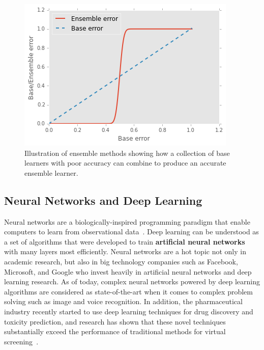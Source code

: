 \documentclass[a4paper,11pt]{article}
\begin{document}
\begin{figure}[!ht]
  \centering
    \includegraphics[scale=1.0]{ensemble}
\caption{\label{fig:ensemble} Illustration of ensemble methods showing how a collection of base learners with poor accuracy can combine to produce an accurate ensemble learner.}
\end{figure}






\subsection{Neural Networks and Deep Learning}

Neural networks are a biologically-inspired programming paradigm that enable computers to learn from observational data~\cite{deeplearning}.
Deep learning can be understood as a set of algorithms that were developed to train \textbf{artificial neural networks} with many layers most efficiently.
 Neural networks are a hot topic not only in academic research, but also in big technology companies such as Facebook, Microsoft, and Google who invest heavily in artificial neural networks and deep learning research. As of today, complex neural networks powered by deep learning algorithms are considered as state-of-the-art when it comes to complex problem solving such as image and voice recognition.
In addition, the pharmaceutical industry recently started to use deep learning techniques for drug discovery and toxicity prediction, and research has shown that these novel techniques substantially exceed the performance of traditional methods for virtual screening~\cite{toxicity}.
\end{document}
